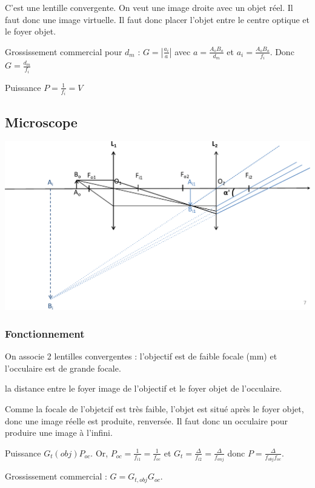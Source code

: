 \documentclass[french]{yLectureNote}
\begin{document}
C'est une lentille convergente. On veut une image droite avec un objet réel. Il faut donc une image virtuelle. Il faut donc placer l'objet entre le centre optique et le foyer objet.


\begin{theorem}
Grossissement commercial pour $d_m$ : \(G = |\frac{a_i}{a}|\) avec \(a = \frac{A_oB_o}{d_m}\) et \(a_i = \frac{A_oB_o}{f_i}\). Donc \(G = \frac{d_m}{f_i}\)

Puissance \(P = \frac{1}{f_i} = V\)
\end{theorem}

\subsection{Microscope}
\includegraphics[scale=0.4]{c2}
\subsubsection{Fonctionnement}
On associe 2 lentilles convergentes : l'objectif est de faible focale (mm) et l'occulaire est de grande focale.
\begin{definition}
la distance entre le foyer image de l'objectif et le foyer objet de l'occulaire.
\end{definition}

Comme la focale de l'objetcif est très faible, l'objet est situé après le foyer objet, donc une image réelle est produite, renversée. Il faut donc un occulaire pour produire une image à l'infini.
\begin{theorem}
Puissance \(G_t(obj)P_{oc}\). Or, \(P_{oc} = \frac{1}{f_{i1}} = \frac{1}{f_{oc}}\) et \(G_t = \frac{\Delta}{f_{i2}} = \frac{\Delta}{f_{onj}}\) donc \(P = \frac{\Delta}{f_{obj}f_{oc}}\).

Grossissement commercial : \(G = G_{t,obj}G_{oc}\).
\end{theorem}
\end{document}
